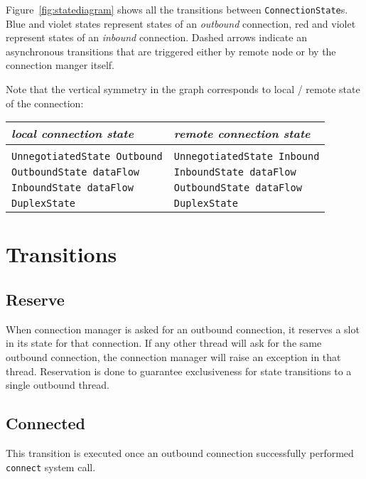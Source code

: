 \documentclass{article}
\def\UnnegotiatedStateOut{\texttt{UnnegotiatedState Outbound}}
\def\UnnegotiatedStateIn{\texttt{UnnegotiatedState Inbound}}
\def\OutboundStateAny{\texttt{OutboundState dataFlow}}
\def\DuplexState{\texttt{DuplexState}}
\def\InboundStateAny{\texttt{InboundState dataFlow}}
\def\Reserve{\textsf{Reserve}}
\def\Connected{\textsf{Connected}}
\begin{document}
Figure~\ref{fig:statediagram} shows all the transitions between
\texttt{ConnectionState}s.  Blue and violet states represent states of
an \textit{outbound} connection, red and violet represent states of an
\textit{inbound} connection.  Dashed arrows indicate an asynchronous
transitions that are triggered either by remote node or by the connection
manger itself.

Note that the vertical symmetry in the graph corresponds to local / remote
state of the connection:

\begin{table}[h]
  \begin{tabular}[h]{l|l}
    \textit{local connection state} & \textit{remote connection state} \\ [0.3em]
    \hline \\ 
    \UnnegotiatedStateOut{}         & \UnnegotiatedStateIn{}           \\ [0.2em]
    \OutboundStateAny{}             & \InboundStateAny{}               \\ [0.2em]
    \InboundStateAny{}              & \OutboundStateAny{}              \\ [0.2em]
    \DuplexState{}                  & \DuplexState{}                   \\ [0.2em]
  \end{tabular}
\end{table}


\section{Transitions}

\subsection{\Reserve{}}
When connection manager is asked for an outbound connection, it reserves a slot
in its state for that connection.  If any other thread will ask for the same
outbound connection, the connection manager will raise an exception in that thread.
Reservation is done to guarantee exclusiveness for state transitions to
a single outbound thread.

\subsection{\Connected{}}
This transition is executed once an outbound connection successfully performed
\texttt{connect} system call. 
\end{document}
